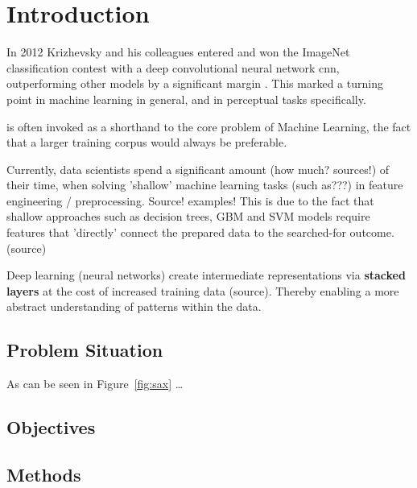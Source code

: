 \chapter{Introduction}

In 2012 Krizhevsky and his colleagues entered and won the ImageNet classification contest with a deep convolutional neural network \ac{cnn}, outperforming other models by a significant margin \cite{krizhevsky2012imagenet}. This marked a turning point in machine learning in general, and in perceptual tasks specifically. 

\cite{norvig_eod} is often invoked as a shorthand to the core problem of Machine Learning, the fact that a larger training corpus would always be preferable.

Currently, data scientists spend a significant amount (how much? sources!) of their time, when solving 'shallow' machine learning tasks (such as???) in feature engineering / preprocessing. Source! examples!
This is due to the fact that shallow approaches such as decision trees, GBM and SVM models require features that 'directly' connect the prepared data to the searched-for outcome. (source) 

Deep learning (neural networks) create intermediate representations via \textbf{stacked layers} at the cost of increased training data (source). 
Thereby enabling a more abstract understanding of patterns within the data.

\citet{Shearer2000}

\section{Problem Situation}



As can be seen in Figure~\ref{fig:sax} \ldots

\section{Objectives}


\section{Methods}


